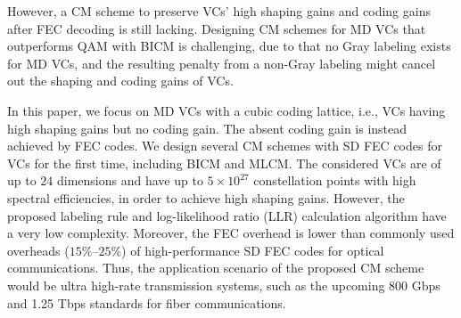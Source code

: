 \documentclass[journal]{IEEEtran}
\begin{document}
However, a CM scheme to preserve VCs' high shaping gains and coding gains after FEC decoding is still lacking. Designing CM schemes for MD VCs that outperforms QAM with BICM is challenging, due to that no Gray labeling exists for MD VCs, and the resulting penalty from a non-Gray labeling might cancel out the shaping and coding gains of VCs. 

In this paper, we focus on MD VCs with a cubic coding lattice, i.e., VCs having high shaping gains but no coding gain. The absent coding gain is instead achieved by FEC codes. We design several CM schemes with SD FEC codes for VCs for the first time, including BICM and MLCM. The considered VCs are of up to $24$ dimensions and have up to $5\times10^{27}$ constellation points with high spectral efficiencies, in order to achieve high shaping gains. However, the proposed labeling rule and log-likelihood ratio (LLR) calculation algorithm have a very low complexity. Moreover, the FEC overhead is lower than commonly used overheads ($15\%$--$25\%$) of high-performance SD FEC codes for optical communications. Thus, the application scenario of the proposed CM scheme would be ultra high-rate transmission systems, such as the upcoming 800 Gbps and 1.25 Tbps standards for fiber communications.






\end{document}
